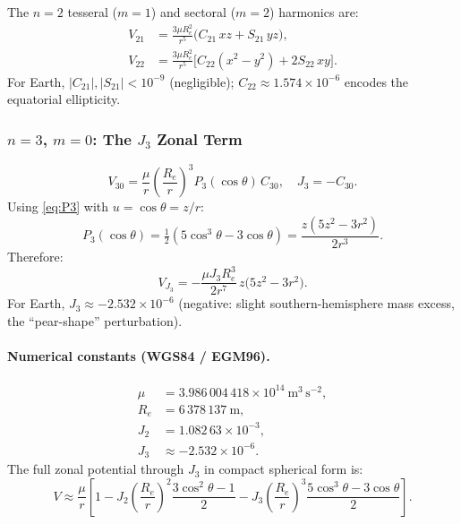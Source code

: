 \documentclass[11pt]{article}
\begin{document}
The $n=2$ tesseral ($m=1$) and sectoral ($m=2$) harmonics are:
\begin{align}
  V_{21} &= \frac{3\mu R_e^2}{r^5}
             \bigl(C_{21}\,xz + S_{21}\,yz\bigr),
  \label{eq:V21}\\
  V_{22} &= \frac{3\mu R_e^2}{r^5}
             \bigl[C_{22}(x^2-y^2) + 2S_{22}\,xy\bigr].
  \label{eq:V22}
\end{align}
For Earth, $|C_{21}|,|S_{21}| < 10^{-9}$ (negligible);
$C_{22} \approx 1.574\times10^{-6}$ encodes the equatorial ellipticity.

\subsubsection{$n=3$, $m=0$: The $J_3$ Zonal Term}

\begin{equation}
  V_{30} = \frac{\mu}{r}\left(\frac{R_e}{r}\right)^{\!3}
            P_3(\cos\theta)\,C_{30},
  \quad J_3 = -C_{30}.
  \label{eq:V30}
\end{equation}
Using \eqref{eq:P3} with $u=\cos\theta=z/r$:
\begin{equation}
  P_3(\cos\theta)
  = \tfrac{1}{2}(5\cos^3\theta - 3\cos\theta)
  = \frac{z(5z^2 - 3r^2)}{2r^3}.
  \label{eq:P3-cart}
\end{equation}
Therefore:
\begin{equation}
  \boxed{
  V_{J_3}
  = -\frac{\mu J_3 R_e^3}{2r^7}\,z\bigl(5z^2 - 3r^2\bigr).
  }
  \label{eq:V-J3}
\end{equation}
For Earth, $J_3 \approx -2.532\times10^{-6}$ (negative: slight
southern-hemisphere mass excess, the ``pear-shape'' perturbation).

\paragraph{Numerical constants (WGS84 / EGM96).}
\begin{align*}
  \mu    &= 3.986\,004\,418\times10^{14}\ \mathrm{m^3\,s^{-2}},\\
  R_e    &= 6\,378\,137\ \mathrm{m},\\
  J_2    &= 1.082\,63\times10^{-3},\\
  J_3    &\approx -2.532\times10^{-6}.
\end{align*}
The full zonal potential through $J_3$ in compact spherical form is:
\begin{equation}
  V \approx \frac{\mu}{r}\left[
    1
    - J_2\left(\frac{R_e}{r}\right)^{\!2}\!\frac{3\cos^2\theta-1}{2}
    - J_3\left(\frac{R_e}{r}\right)^{\!3}\!\frac{5\cos^3\theta-3\cos\theta}{2}
  \right].
  \label{eq:V-J2J3}
\end{equation}
\end{document}
